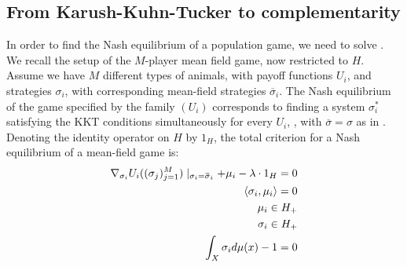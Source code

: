 \subsection{From Karush-Kuhn-Tucker to complementarity}
In order to find the Nash equilibrium of a population game, we need to solve . We recall the setup of the $M$-player mean field game, now restricted to $H$. Assume we have $M$ different types of animals, with payoff functions $U_i$, and strategies $\sigma_i$, with corresponding mean-field strategies $\overbar{\sigma}_i$.
The Nash equilibrium of the game specified by the family $(U_i)$ corresponds to finding a system $\sigma_i^*$ satisfying the KKT conditions simultaneously for every $U_i$, \citep{deimling2010nonlinear}, with $\overbar{\sigma}=\sigma$ as in . Denoting the identity operator on $H$ by $1_H$, the total criterion for a Nash equilibrium of a mean-field game  is:
\begin{equation}
  \label{eq:KKT_total}
  \begin{split}
  \nabla_{\sigma_i}U_i((\sigma_j)_{j=1}^M) \mid_{\sigma_i = \overbar{\sigma}_i}  + \mu_i - \lambda  \cdot 1_H = 0 \\
  \ip{\sigma_i}{\mu_i} = 0 \\
  \mu_i \in H_+ \\
  \sigma_i \in H_+ \\
  \int_X \sigma_i d\mu(x)- 1 = 0
\end{split}
\end{equation}
